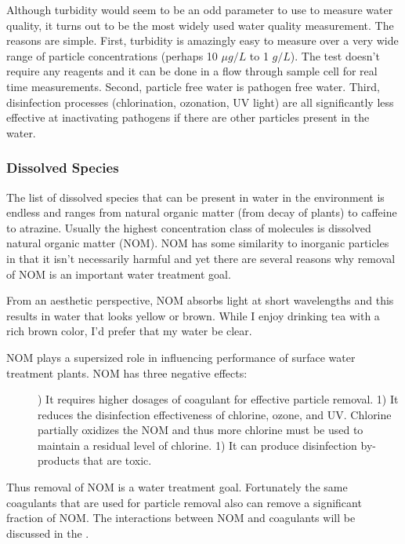 \documentclass[letterpaper,10pt,english]{sphinxmanual}
\begin{document}
Although turbidity would seem to be an odd parameter to use to measure water quality, it turns out to be the most widely used water quality measurement. The reasons are simple. First, turbidity is amazingly easy to measure over a very wide range of particle concentrations (perhaps 10 \(\mu g/L\) to 1 \(g/L\)). The test doesn’t require any reagents and it can be done in a flow through sample cell for real time measurements. Second, particle free water is pathogen free water. Third, disinfection processes (chlorination, ozonation, UV light) are all significantly less effective at inactivating pathogens if there are other particles present in the water.


\subsubsection{Dissolved Species}
\label{\detokenize{Introduction/Introduction:dissolved-species}}\label{\detokenize{Introduction/Introduction:heading-dissolved-species}}
The list of dissolved species that can be present in water in the environment is endless and ranges from natural organic matter (from decay of plants) to caffeine to atrazine. Usually the highest concentration class of molecules is dissolved natural organic matter (NOM). NOM has some similarity to inorganic particles in that it isn’t necessarily harmful and yet there are several reasons why removal of NOM is an important water treatment goal.

From an aesthetic perspective, NOM absorbs light at short wavelengths and this results in water that looks yellow or brown. While I enjoy drinking tea with a rich brown color, I’d prefer that my water be clear.
\begin{description}
\item[{NOM plays a supersized role in influencing performance of surface water treatment plants. NOM has three negative effects:}] ) It requires higher dosages of coagulant for effective particle removal.
1) It reduces the disinfection effectiveness of chlorine, ozone, and UV. Chlorine partially oxidizes the NOM and thus more chlorine must be used to maintain a residual level of chlorine.
1) It can produce disinfection by-products that are toxic.

\end{description}

Thus removal of NOM is a water treatment goal. Fortunately the same coagulants that are used for particle removal also can remove a significant fraction of NOM. The interactions between NOM and coagulants will be discussed in the {\hyperref[\detokenize{Rapid_Mix/RM_Intro:title-rapid-mix-introduction}]{}}.
\end{document}
